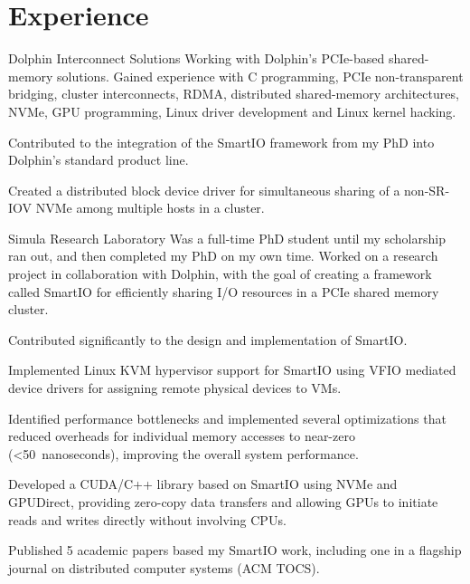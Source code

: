 \section{Experience}
\begin{experience}{Dolphin Interconnect Solutions}{
}
Working with Dolphin's PCIe-based shared-memory solutions. 
Gained experience with C programming, PCIe non-transparent bridging, cluster interconnects, RDMA, distributed shared-memory
architectures, NVMe, GPU programming, Linux driver development and Linux kernel hacking.
\begin{contribs}
    \item{Contributed to the integration of the SmartIO framework from my PhD into Dolphin's standard product line.}
	\item{Created a distributed block device driver for simultaneous sharing of a non-SR-IOV NVMe among multiple hosts in a cluster.}
\end{contribs}
\end{experience}


\begin{experience}{Simula Research Laboratory}{
}
Was a full-time PhD student until my scholarship ran out, and then completed my PhD on my own time.
Worked on a research project in collaboration with Dolphin, with the goal of creating a framework called SmartIO for efficiently sharing I/O resources in a PCIe shared memory cluster.%
\begin{contribs}
    \item{Contributed significantly to the design and implementation of SmartIO.}
	\item{Implemented Linux KVM hypervisor support for SmartIO using VFIO mediated device drivers
		for assigning remote physical devices to VMs.}
    \item{Identified performance bottlenecks and implemented several optimizations that reduced overheads for individual memory accesses to near-zero (\textless 50~nanoseconds), improving the overall system performance.}
	\item{Developed a CUDA/C++ library based on SmartIO using NVMe and GPUDirect, providing
		zero-copy data transfers and allowing GPUs to initiate reads and writes directly without involving CPUs.}
    \item{Published 5 academic papers based my SmartIO work, including one in a flagship journal on distributed computer systems (ACM TOCS).}
\end{contribs}
\end{experience}


